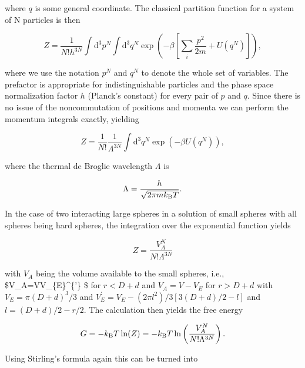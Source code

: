 \documentclass[letterpaper,10pt,english]{sphinxmanual}
\begin{document}
\sphinxAtStartPar
where \(q\) is some general coordinate. The classical partition function for a system of N particles is then

\sphinxAtStartPar
\begin{equation}
Z=\frac{1}{N!h^{3N}}\int \mathrm d^{3}p^{N}\int \mathrm d^{3}q^{N}\exp\left ( -\beta \left [ \sum_{i}\frac{p^2}{2m}+U(q^N)\right ]\right ),
\end{equation}

\sphinxAtStartPar
where we use the notation \(p^N\) and \(q^N\) to denote the whole set of variables. The prefactor is appropriate for indistinguishable particles and the phase space normalization factor \(h\) (Planck’s constant) for every pair of \(p\) and \(q\). Since there is no issue of the non\sphinxhyphen{}commutation of positions and momenta we can perform the momentum integrals exactly, yielding

\sphinxAtStartPar
\begin{equation}
Z=\frac{1}{N!}\frac{1}{\Lambda^{3N}}\int \mathrm d^{3}q^{N}\exp(-\beta U(q^{N})),
\end{equation}

\sphinxAtStartPar
where the thermal de Broglie wavelength \(Λ\) is

\sphinxAtStartPar
\begin{equation}
\Lambda=\frac{h}{\sqrt{2 \pi m k_{\rm B}T}}.
\end{equation}

\sphinxAtStartPar
In the case of two interacting large spheres in a solution of small spheres with all spheres being hard spheres, the integration over the exponential function yields

\sphinxAtStartPar
\begin{equation}
Z=\frac{V_{A}^{N}}{N! \Lambda^{3N}}
\end{equation}

\sphinxAtStartPar
with \(V_A\) being the volume available to the small spheres, i.e., \$V\_A=V\sphinxhyphen{}V\_\{E\}\textasciicircum{}\{’\} \$ for \(r<D+d\) and \(V_A=V-V_E\) for \(r>D+d\) with \(V_E=π(D+d)^3/3\) and \(V_{E}^{'}=V_E-(2πl^2)/3 [3(D+d)/2-l]\) and \(l=(D+d)/2-r/2\). The calculation then yields the free energy

\sphinxAtStartPar
\begin{equation}
G=-k_{\rm B}T\ln(Z) =-k_{\rm B}T\ln\left (\frac{V_{A}^N}{N!\Lambda^{3N}}\right).
\end{equation}

\sphinxAtStartPar
Using Stirling’s formula again this can be turned into
\end{document}

